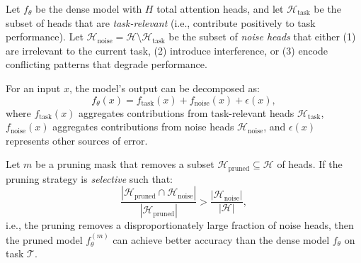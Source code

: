 Let $f_\theta$ be the dense model with $H$ total attention heads, and let $\mathcal{H}_{\mathrm{task}}$ be the subset of heads that are \emph{task-relevant} (i.e., contribute positively to task performance).
Let $\mathcal{H}_{\mathrm{noise}} = \mathcal{H} \setminus \mathcal{H}_{\mathrm{task}}$ be the subset of \emph{noise heads} that either (1) are irrelevant to the current task, (2) introduce interference, or (3) encode conflicting patterns that degrade performance.

For an input $x$, the model's output can be decomposed as:
\begin{equation}
f_\theta(x) = f_{\mathrm{task}}(x) + f_{\mathrm{noise}}(x) + \epsilon(x),
\end{equation}
where $f_{\mathrm{task}}(x)$ aggregates contributions from task-relevant heads $\mathcal{H}_{\mathrm{task}}$, $f_{\mathrm{noise}}(x)$ aggregates contributions from noise heads $\mathcal{H}_{\mathrm{noise}}$, and $\epsilon(x)$ represents other sources of error.

\begin{theorem}
\label{thm:pruning_noise_reduction}
Let $m$ be a pruning mask that removes a subset $\mathcal{H}_{\mathrm{pruned}} \subseteq \mathcal{H}$ of heads.
If the pruning strategy is \emph{selective} such that:
\begin{equation}
\frac{|\mathcal{H}_{\mathrm{pruned}} \cap \mathcal{H}_{\mathrm{noise}}|}{|\mathcal{H}_{\mathrm{pruned}}|} > \frac{|\mathcal{H}_{\mathrm{noise}}|}{|\mathcal{H}|},
\end{equation}
i.e., the pruning removes a disproportionately large fraction of noise heads, then the pruned model $f_{\theta}^{(m)}$ can achieve better accuracy than the dense model $f_\theta$ on task $\mathcal{T}$.
\end{theorem}

